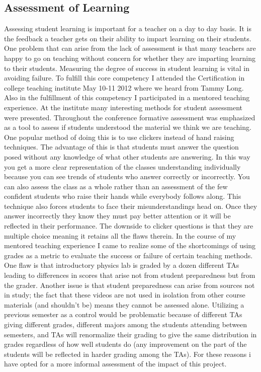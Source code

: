 \documentclass{article}
\begin{document}
\subsection{Assessment of Learning}
\hspace{0.5cm}Assessing student learning is important for a teacher on a day to day basis. It is the feedback a teacher gets on their ability to impart learning on their students. One problem that can arise from the lack of assessment is that many teachers are happy to go on teaching without concern for whether they are imparting learning to their students. Measuring the degree of success in student learning is vital in avoiding failure. 
To fulfill this core competency I attended the Certification in college teaching institute May 10-11 2012 where we heard from Tammy Long. Also in the fulfillment of this competency I participated in a mentored teaching experience. 
At the institute many interesting methods for student assessment were presented. Throughout the conference formative assessment was emphasized as a tool to assess if students understood the material we think we are teaching. One popular method of doing this is to use clickers instead of hand raising techniques. The advantage of this is that students must answer the question posed without any knowledge of what other students are answering. In this way you get a more clear representation of the classes understanding individually because you can see trends of students who answer correctly or incorrectly. You can also assess the class as a whole rather than an assessment of the few confident students who raise their hands while everybody follows along. This technique also forces students to face their misunderstandings head on. Once they answer incorrectly they know they must pay better attention or it will be reflected in their performance. The downside to clicker questions is that they are multiple choice meaning it retains all the flaws therein. 
In the course of my mentored teaching experience I came to realize some of the shortcomings of using grades as a metric to evaluate the success or failure of certain teaching methods. One flaw is that introductory physics lab is graded by a dozen different TAs leading to differences in scores that arise not from student preparedness but from the grader. Another issue is that student preparedness can arise from sources not in study; the fact that these videos are not used in isolation from other course materials (and shouldn't be) means they cannot be assessed alone. Utilizing a previous semester as a control would be problematic because of different TAs giving different grades, different majors among the students attending between semesters, and TAs will renormalize their grading to give the same distribution in grades regardless of how well students do (any improvement on the part of the students will be reflected in harder grading among the TAs). For these reasons i have opted for a more informal assessment of the impact of this project. 
\end{document}
